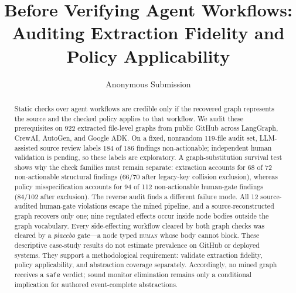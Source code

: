 \documentclass[letterpaper]{article} %
\title{Before Verifying Agent Workflows: Auditing Extraction Fidelity and Policy Applicability}
\author{Anonymous Submission}
\begin{document}
\maketitle

\begin{abstract}
Static checks over agent workflows are credible only if the recovered graph
represents the source and the checked policy applies to that workflow. We audit
these prerequisites on 922 extracted file-level graphs from public GitHub
across LangGraph, CrewAI, AutoGen, and Google ADK. On a fixed, nonrandom
119-file audit set, LLM-assisted source review labels 184 of 186 findings
non-actionable; independent human validation is pending, so these labels are
exploratory. A graph-substitution survival test shows why the check families
must remain separate: extraction accounts for 68 of 72 non-actionable
structural findings (66/70 after legacy-key collision exclusion), whereas
policy misspecification accounts for 94 of 112 non-actionable human-gate
findings (84/102 after exclusion). The reverse audit finds a different failure
mode. All 12 source-audited human-gate violations escape the mined pipeline,
and a source-reconstructed graph recovers only one; nine regulated effects
occur inside node bodies outside the graph vocabulary. Every side-effecting
workflow cleared by both graph checks was cleared by a \emph{placebo} gate---a
node typed \textsc{human} whose body cannot block. These descriptive case-study
results do not estimate prevalence on GitHub or deployed systems. They support
a methodological requirement: validate extraction fidelity, policy
applicability, and abstraction coverage separately. Accordingly, no mined
graph receives a \texttt{safe} verdict; sound monitor elimination remains only
a conditional implication for authored event-complete abstractions.
\end{abstract}









\end{document}
